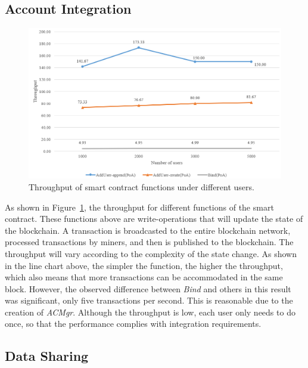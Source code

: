 \subsection*{Account Integration}
\begin{figure}[htb]
    \centering
    \includegraphics[height=!,width=1\linewidth,keepaspectratio=true]{figures/smart_contract_tps.png}
    \caption{{\footnotesize Throughput of smart contract functions under different users.}}
    \label{fig:contract_tps}
\end{figure}
As shown in Figure~\ref{fig:contract_tps}, the throughput for different functions of the smart contract. These functions above are write-operations that will update the state of the blockchain. A transaction is broadcasted to the entire blockchain network, processed transactions by miners, and then is published to the blockchain. The throughput will vary according to the complexity of the state change. As shown in the line chart above, the simpler the function, the higher the throughput, which also means that more transactions can be accommodated in the same block. However, the observed difference between \textit{Bind} and others in this result was significant, only five transactions per second. This is reasonable due to the creation of \textit{ACMgr}. Although the throughput is low, each user only needs to do once, so that the performance complies with integration requirements.

\newpage

\subsection*{Data Sharing}



